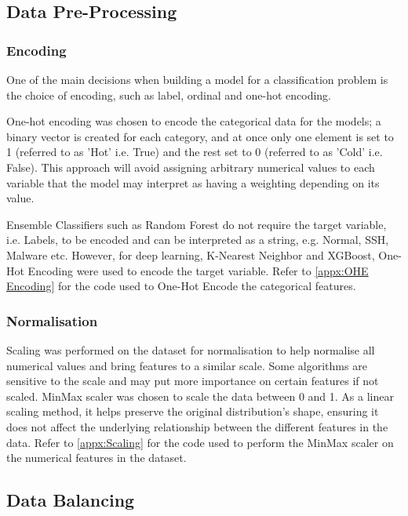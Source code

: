 \subsection{Data Pre-Processing}

\subsubsection{Encoding}

One of the main decisions when building a model for a classification problem is the choice of encoding, such as label, ordinal and one-hot encoding.

One-hot encoding was chosen to encode the categorical data for the models; a binary vector is created for each category, and at once only one element is set to 1 (referred to as 'Hot' i.e. True) and the rest set to 0 (referred to as 'Cold' i.e. False). This approach will avoid assigning arbitrary numerical values to each variable that the model may interpret as having a weighting depending on its value. 

Ensemble Classifiers such as Random Forest do not require the target variable, i.e. Labels, to be encoded and can be interpreted as a string, e.g. Normal, SSH, Malware etc. However, for deep learning, K-Nearest Neighbor and XGBoost, One-Hot Encoding were used to encode the target variable. Refer to \ref{appx:OHE Encoding} for the code used to One-Hot Encode the categorical features. 

\subsubsection{Normalisation}

Scaling was performed on the dataset for normalisation to help normalise all numerical values and bring features to a similar scale. Some algorithms are sensitive to the scale and may put more importance on certain features if not scaled. MinMax scaler was chosen to scale the data between 0 and 1. As a linear scaling method, it helps preserve the original distribution's shape, ensuring it does not affect the underlying relationship between the different features in the data. Refer to \ref{appx:Scaling} for the code used to perform the MinMax scaler on the numerical features in the dataset.

\subsection{Data Balancing}

